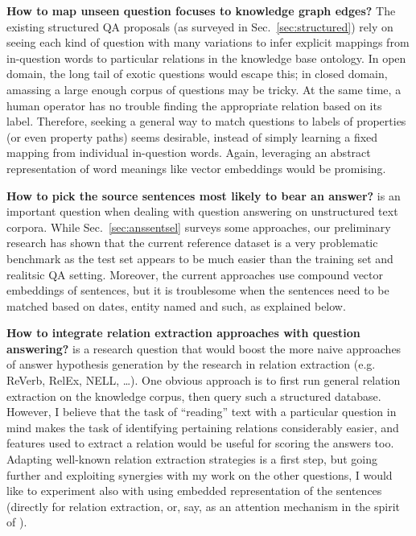 \textbf{How to map unseen question focuses to knowledge graph edges?}
The existing structured QA proposals (as surveyed in Sec.~\ref{sec:structured})
rely on seeing each kind of question with many variations to infer explicit mappings
from in-question words to particular relations in the knowledge base ontology.
In open domain, the long tail of exotic questions would escape this;
in closed domain, amassing a large enough corpus of questions may be tricky.
At the same time, a human operator has no trouble finding the appropriate
relation based on its label.
Therefore, seeking a general way to match questions to labels of properties
(or even property paths) seems desirable, instead of simply learning a fixed
mapping from individual in-question words.
Again, leveraging an abstract representation of word meanings like vector
embeddings would be promising.

\textbf{How to pick the source sentences most likely to bear an answer?}
is an important question when dealing with question answering on unstructured
text corpora.  While Sec.~\ref{sec:anssentsel} surveys some approaches,
our preliminary research has shown that the current reference dataset
is a very problematic benchmark as the test set appears to be much easier
than the training set and realitsic QA setting.
Moreover, the current approaches use compound vector embeddings of sentences,
but it is troublesome when the sentences need to be matched based on dates,
entity named and such, as explained below.

\textbf{How to integrate relation extraction approaches with question answering?}
is a research question that would boost the more naive approaches of answer
hypothesis generation by the research in relation extraction (e.g. ReVerb, RelEx, NELL, \dots).
One obvious approach is to first run general relation extraction on the knowledge
corpus, then query such a structured database.  However, I believe that the task
of ``reading'' text with a particular question in mind makes the task of identifying
pertaining relations considerably easier, and features used to extract a relation
would be useful for scoring the answers too.
Adapting well-known relation extraction strategies is a first step,
but going further and exploiting synergies with my work on the other questions,
I would like to experiment also with using embedded representation
of the sentences
(directly for relation extraction, or, say, as an attention mechanism
in the spirit of \cite{ReadAndComprehend}).

